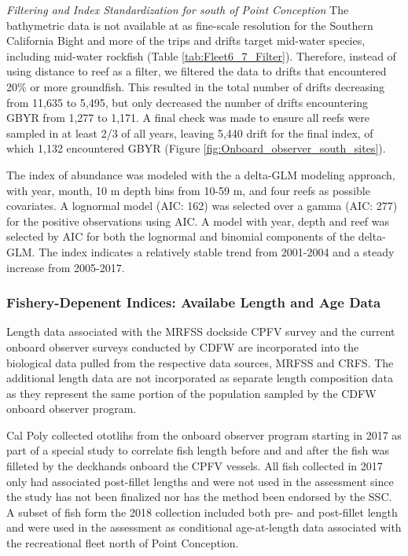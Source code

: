 \documentclass[12pt,]{article}
\begin{document}
\emph{Filtering and Index Standardization for south of Point Conception}
The bathymetric data is not available at as fine-scale resolution for
the Southern California Bight and more of the trips and drifts target
mid-water species, including mid-water rockfish (Table
\ref{tab:Fleet6_7_Filter}). Therefore, instead of using distance to reef
as a filter, we filtered the data to drifts that encountered 20\% or
more groundfish. This resulted in the total number of drifts decreasing
from 11,635 to 5,495, but only decreased the number of drifts
encountering GBYR from 1,277 to 1,171. A final check was made to ensure
all reefs were sampled in at least 2/3 of all years, leaving 5,440 drift
for the final index, of which 1,132 encountered GBYR (Figure
\ref{fig:Onboard_observer_south_sites}).

The index of abundance was modeled with the a delta-GLM modeling
approach, with year, month, 10 m depth bins from 10-59 m, and four reefs
as possible covariates. A lognormal model (AIC: 162) was selected over a
gamma (AIC: 277) for the positive observations using AIC. A model with
year, depth and reef was selected by AIC for both the lognormal and
binomial components of the delta-GLM. The index indicates a relatively
stable trend from 2001-2004 and a steady increase from 2005-2017.

\subsubsection{Fishery-Depenent Indices: Availabe Length and Age
Data}\label{fishery-depenent-indices-availabe-length-and-age-data}

Length data associated with the MRFSS dockside CPFV survey and the
current onboard observer surveys conducted by CDFW are incorporated into
the biological data pulled from the respective data sources, MRFSS and
CRFS. The additional length data are not incorporated as separate length
composition data as they represent the same portion of the population
sampled by the CDFW onboard observer program.

Cal Poly collected ototlihs from the onboard observer program starting
in 2017 as part of a special study to correlate fish length before and
and after the fish was filleted by the deckhands onboard the CPFV
vessels. All fish collected in 2017 only had associated post-fillet
lengths and were not used in the assessment since the study has not been
finalized nor has the method been endorsed by the SSC. A subset of fish
form the 2018 collection included both pre- and post-fillet length and
were used in the assessment as conditional age-at-length data associated
with the recreational fleet north of Point Conception.
\end{document}
